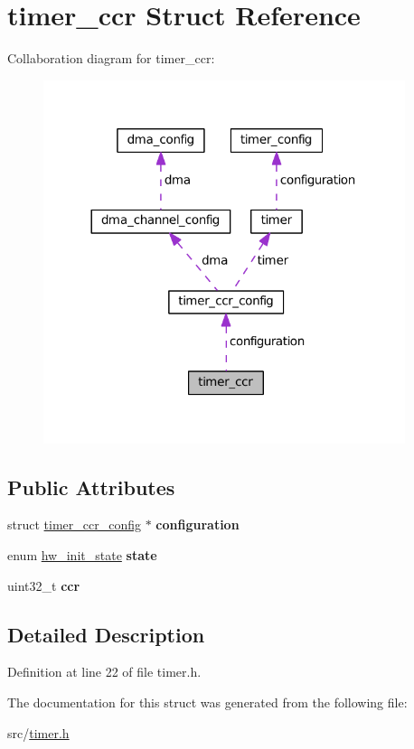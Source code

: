 \hypertarget{structtimer__ccr}{}\section{timer\+\_\+ccr Struct Reference}
\label{structtimer__ccr}


Collaboration diagram for timer\+\_\+ccr\+:
\nopagebreak
\begin{figure}[H]
\begin{center}
\leavevmode
\includegraphics[width=300pt]{structtimer__ccr__coll__graph}
\end{center}
\end{figure}
\subsection*{Public Attributes}
\begin{DoxyCompactItemize}
\item 
\hypertarget{structtimer__ccr_ae53385b34f3535fa8cc732edc5fccc28}{}struct \hyperlink{structtimer__ccr__config}{timer\+\_\+ccr\+\_\+config} $\ast$ {\bfseries configuration}\label{structtimer__ccr_ae53385b34f3535fa8cc732edc5fccc28}

\item 
\hypertarget{structtimer__ccr_addba2954b9a68f87a1e716a65095c6a9}{}enum \hyperlink{hw_8h_a3c02952100e7d051b77cdf060ca0ba9b}{hw\+\_\+init\+\_\+state} {\bfseries state}\label{structtimer__ccr_addba2954b9a68f87a1e716a65095c6a9}

\item 
\hypertarget{structtimer__ccr_a60cdc480531c921c61c6192afff7a0dd}{}uint32\+\_\+t {\bfseries ccr}\label{structtimer__ccr_a60cdc480531c921c61c6192afff7a0dd}

\end{DoxyCompactItemize}


\subsection{Detailed Description}


Definition at line 22 of file timer.\+h.



The documentation for this struct was generated from the following file\+:\begin{DoxyCompactItemize}
\item 
src/\hyperlink{timer_8h}{timer.\+h}\end{DoxyCompactItemize}
